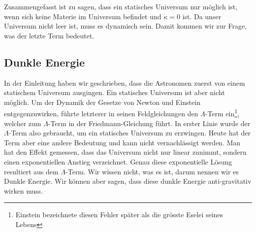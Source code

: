 \begin{refsection}
Zusammengefasst ist zu sagen, dass ein statisches Universum nur möglich ist, wenn sich keine Materie im Universum befindet und $\kappa = 0$ ist. Da unser Universum nicht leer ist, muss es dynamisch sein. Damit kommen wir zur Frage, was der letzte Term bedeutet.

\subsection{Dunkle Energie}
In der Einleitung haben wir geschrieben, dass die Astronomen zuerst von einem statischem Universum ausgingen. Ein statisches Universum ist aber nicht möglich. Um der Dynamik der Gesetze von Newton und Einstein entgegenzuwirken, führte letzterer in seinen Feldgleichungen den $\Lambda$-Term ein\footnote{Einstein bezeichnete diesen Fehler später als die grösste Eselei seines Lebens}, welcher zum $\Lambda$-Term in der Friedmann-Gleichung führt. In erster Linie wurde der $\Lambda$-Term also gebraucht, um ein statisches Universum zu erzwingen. Heute hat der Term aber eine andere Bedeutung und kann nicht vernachlässigt werden. Man hat den Effekt gemessen, dass das Universum nicht nur linear zunimmt, sondern einen exponentiellen Anstieg verzeichnet. Genau diese exponentielle Lösung resultiert aus dem $\Lambda$-Term. Wir wissen nicht, was es ist, darum nennen wir es Dunkle Energie. Wir können aber sagen, dass diese dunkle Energie anti-gravitativ wirken muss.
\end{refsection}
